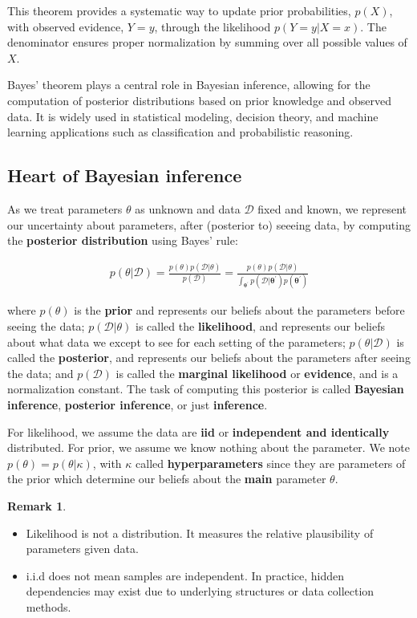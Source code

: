\documentclass[12pt, a4paper]{article}
\theoremstyle{definition}
\newtheorem*{remark}{Remark} %
\numberwithin{figure}{section}
\numberwithin{equation}{section}
\numberwithin{table}{section}
\begin{document}
This theorem provides a systematic way to update prior probabilities, $p(X)$, with observed evidence, $Y = y$, through the likelihood $p(Y = y | X = x)$. The denominator ensures proper normalization by summing over all possible values of $X$.

Bayes' theorem plays a central role in Bayesian inference, allowing for the computation of posterior distributions based on prior knowledge and observed data. It is widely used in statistical modeling, decision theory, and machine learning applications such as classification and probabilistic reasoning.

\subsection{Heart of Bayesian inference}
As we treat parameters $\theta$ as unknown and data $\mathcal{D}$ fixed and known, we represent our uncertainty about parameters, after (posterior to) seeeing data, by computing the \textbf{posterior distribution} using Bayes' rule:

\begin{align}
    p(\theta | \mathcal{D}) = \frac{p(\theta) p(\mathcal{D} | \theta)}{p(\mathcal{D})} = \frac{p(\theta) p(\mathcal{D} | \theta)}{\int_{\boldsymbol{\theta^{'}}} p(\mathcal{D}|\boldsymbol{\theta^{'}})p(\boldsymbol{\theta^{'}})}
\end{align}

where $p(\theta)$ is the \textbf{prior} and represents our beliefs about the parameters before seeing the data; $p(\mathcal{D} | \theta)$ is called the \textbf{likelihood}, and represents our beliefs about what data we except to see for each setting of the parameters; $p(\theta | \mathcal{D})$ is called the \textbf{posterior}, and represents our beliefs about the parameters after seeing the data; and $p(\mathcal{D})$ is called the \textbf{marginal likelihood} or \textbf{evidence}, and is a normalization constant.
The task of computing this posterior is called \textbf{Bayesian inference}, \textbf{posterior inference}, or just \textbf{inference}.

For likelihood, we assume the data are \textbf{iid} or \textbf{independent and identically} distributed. For prior, we assume we know nothing about the parameter. We note $p(\theta) = p(\theta|\kappa)$, with $\kappa$ called \textbf{hyperparameters} since they are parameters of the prior which determine our beliefs about the \textbf{main} parameter $\theta$.

\begin{remark}
\leavevmode
\begin{itemize}
\item Likelihood is not a distribution. It measures the relative plausibility of parameters given data.
\item i.i.d does not mean samples are independent. In practice, hidden dependencies may exist due to underlying structures or data collection methods.
\end{itemize}
\end{remark}
\end{document}
